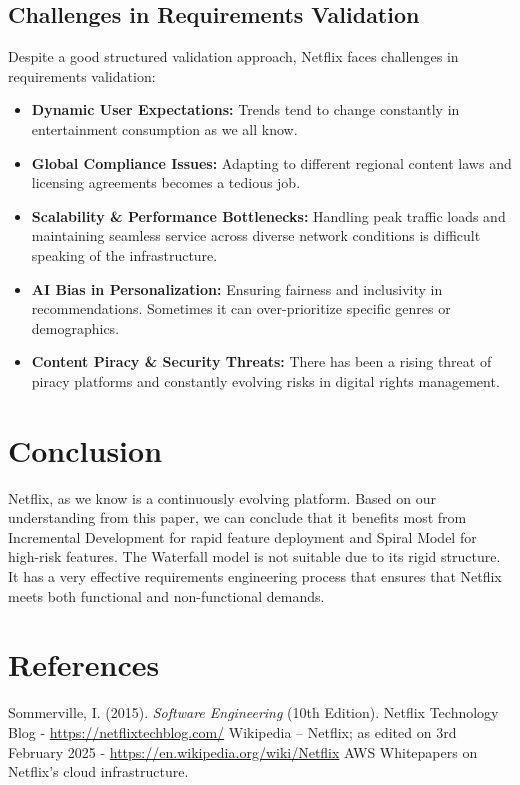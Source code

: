 \documentclass[a4paper,10pt,twoside]{article}
\begin{document}
\subsection{Challenges in Requirements Validation}
Despite a good structured validation approach, Netflix faces challenges in requirements validation:
\begin{itemize}
    \item \textbf{Dynamic User Expectations: } Trends tend to change constantly in entertainment consumption as we all know.
    \item \textbf{Global Compliance Issues: } Adapting to different regional content laws and licensing agreements becomes a tedious job.
    \item \textbf{Scalability & Performance Bottlenecks: } Handling peak traffic loads and maintaining seamless service across diverse network conditions is difficult speaking of the infrastructure.
    \item \textbf{AI Bias in Personalization: } Ensuring fairness and inclusivity in recommendations. Sometimes it can over-prioritize specific genres or demographics.
    \item \textbf{Content Piracy & Security Threats: } There has been a rising threat of piracy platforms and constantly evolving risks in digital rights management.
\end{itemize}

\section{Conclusion}
Netflix, as we know is a continuously evolving platform. Based on our understanding from this paper, we can conclude that it benefits most from Incremental Development for rapid feature deployment and Spiral Model for high-risk features. The Waterfall model is not suitable due to its rigid structure.
It has a very effective requirements engineering process that ensures that Netflix meets both functional and non-functional demands.

\section{References}
\begin{thebibliography}{9}
     Sommerville, I. (2015). \textit{Software Engineering} (10th Edition).
     Netflix Technology Blog - \url{https://netflixtechblog.com/}
     Wikipedia – Netflix; as edited on 3rd February 2025  - \url{https://en.wikipedia.org/wiki/Netflix}
     AWS Whitepapers on Netflix’s cloud infrastructure.
\end{thebibliography}
\end{document}
